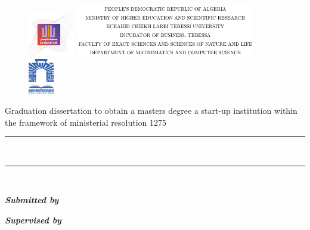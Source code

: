 \begin{titlepage}
	\begin{figure}
		\centering
		\begin{adjustbox}{valign=c}
			\includegraphics[width=0.18\textwidth]{./images/incubator.png}
		\end{adjustbox}
		\hfill
		\begin{adjustbox}{valign=c}
			\includegraphics[width=0.7\textwidth]{./images/title.png}
		\end{adjustbox}
		\hfill
		\begin{adjustbox}{valign=c}
			\includegraphics[width=0.1\textwidth]{./images/university.png}
		\end{adjustbox}
		\vspace{1cm}
	\end{figure}
	\begin{center}
		\Large{Graduation dissertation to obtain a masters degree a start-up institution within the framework of ministerial resolution 1275}\\[0.5cm]
		\rule{\textwidth}{0.075cm}\\[0.4cm]
		\textsc{\huge \bfseries \@title}
		\rule{\textwidth}{0.075cm}\\[2cm]
		\begin{minipage}{0.375\textwidth}
			\begin{flushleft}
				\emph{\textbf{Submitted by}}\\
				\textsc{\@author}
			\end{flushleft}
		\end{minipage}
		\begin{minipage}{0.375\textwidth}
			\begin{flushright}
				\emph{\textbf{Supervised by}}\\

\end{flushright}
\end{minipage}
\end{center}
\end{titlepage}
